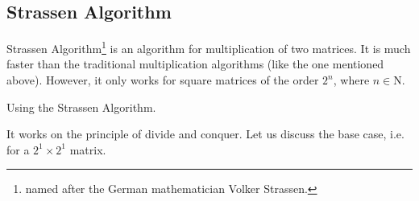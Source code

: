 	\subsection{Strassen Algorithm}
	Strassen Algorithm\footnote{named after the German mathematician Volker Strassen.} is an algorithm for multiplication of two matrices. It is much faster than the traditional multiplication algorithms (like the one mentioned above). However, it only works for square matrices of the order $2^n$, where $n\in \mathrm{N}$.
	\begin{eg}
		Using the Strassen Algorithm.
	\end{eg}
	\begin{explanation}
		It works on the principle of divide and conquer. Let us discuss the base case, i.e. for a $2^1\times 2^1$ matrix.
	\end{explanation}
	


